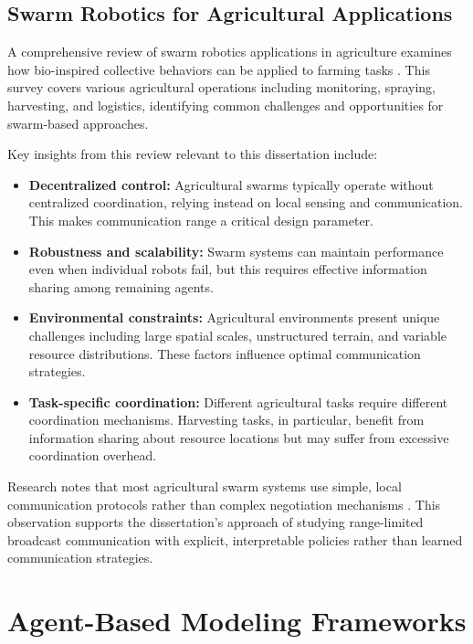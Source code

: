 \subsection{Swarm Robotics for Agricultural Applications}

A comprehensive review of swarm robotics applications in agriculture examines how bio-inspired collective behaviors can be applied to farming tasks \citep{albani2017}. This survey covers various agricultural operations including monitoring, spraying, harvesting, and logistics, identifying common challenges and opportunities for swarm-based approaches.

Key insights from this review relevant to this dissertation include:

\begin{itemize}
    \item \textbf{Decentralized control:} Agricultural swarms typically operate without centralized coordination, relying instead on local sensing and communication. This makes communication range a critical design parameter.

    \item \textbf{Robustness and scalability:} Swarm systems can maintain performance even when individual robots fail, but this requires effective information sharing among remaining agents.

    \item \textbf{Environmental constraints:} Agricultural environments present unique challenges including large spatial scales, unstructured terrain, and variable resource distributions. These factors influence optimal communication strategies.

    \item \textbf{Task-specific coordination:} Different agricultural tasks require different coordination mechanisms. Harvesting tasks, in particular, benefit from information sharing about resource locations but may suffer from excessive coordination overhead.
\end{itemize}

Research notes that most agricultural swarm systems use simple, local communication protocols rather than complex negotiation mechanisms \citep{albani2017}. This observation supports the dissertation's approach of studying range-limited broadcast communication with explicit, interpretable policies rather than learned communication strategies.



\section{Agent-Based Modeling Frameworks}


